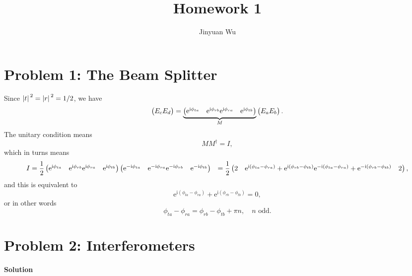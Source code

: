 \documentclass[hyperref, a4paper]{article}
\title{Homework 1}
\author{Jinyuan Wu}
\newcommand*{\ii}{\mathrm{i}}
\newcommand*{\ee}{\mathrm{e}}
\def\\{}%
\begin{document}
\maketitle 

\section{Problem 1: The Beam Splitter}

Since $\abs*{t}^2 = \abs*{r}^2 = 1/2$,
we have 
\begin{equation}
    \pmqty{E_c \\ E_d} = 
    \underbrace{
        \pmqty{
        \ee^{\ii \phi_{ta}} & \ee^{\ii \phi_{rb}} \\
        \ee^{\ii \phi_{ra}} & \ee^{\ii \phi_{tb}} 
        }
    }_M \pmqty{E_{a} \\ E_b}.
\end{equation}
The unitary condition means 
\begin{equation}
    M M^\dagger = I,
\end{equation}
which in turns means 
\[
    \begin{aligned}
        I &= \frac{1}{2} \pmqty{
            \ee^{\ii \phi_{ta}} & \ee^{\ii \phi_{rb}} \\
            \ee^{\ii \phi_{ra}} & \ee^{\ii \phi_{tb}} 
        } 
        \pmqty{
            \ee^{- \ii \phi_{ta}} & \ee^{-\ii \phi_{ra}} \\
            \ee^{- \ii \phi_{rb}} & \ee^{-\ii \phi_{tb}} 
        } \\ 
        &= \frac{1}{2} \pmqty{
            2 & \ee^{\ii (\phi_{ta} - \phi_{ra})} + \ee^{\ii (\phi_{rb} - \phi_{tb})} \\
            \ee^{- \ii (\phi_{ta} - \phi_{ra})} + \ee^{- \ii (\phi_{rb} - \phi_{tb})} & 2
        },
    \end{aligned}
\]
and this is equivalent to 
\[
    \ee^{\ii (\phi_{ta} - \phi_{ra})} + \ee^{\ii (\phi_{rb} - \phi_{tb})} = 0,
\]
or in other words 
\begin{equation}
    \phi_{ta} - \phi_{ra} = \phi_{rb} - \phi_{tb} + \pi n, \quad \text{$n$ odd}.
\end{equation}

\section{Problem 2: Interferometers}

\paragraph*{Solution} 
\end{document}
